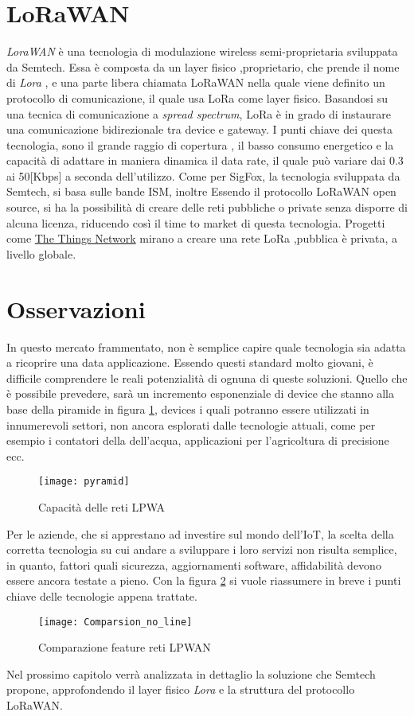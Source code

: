 \section{LoRaWAN}
\emph{LoraWAN} è una tecnologia di modulazione wireless semi-proprietaria 
sviluppata da Semtech. Essa è composta da un layer fisico ,proprietario, che
prende il nome di \emph{Lora}\cite{LoRaCss101} , e una parte libera chiamata 
LoRaWAN\cite{LoRaWAN101} nella quale viene definito un protocollo di comunicazione, 
il quale usa LoRa come layer fisico. 
Basandosi su una tecnica di comunicazione a \emph{spread spectrum}, LoRa è in
grado di instaurare una comunicazione bidirezionale tra device e gateway.
I punti chiave dei questa tecnologia, sono il grande raggio di copertura , il 
basso consumo energetico e la capacità di adattare in maniera dinamica il
data rate, il quale può variare dai 0.3 ai 50[Kbps] a seconda dell'utilizzo. 
Come per SigFox, la tecnologia sviluppata da Semtech, si basa sulle bande ISM,
inoltre Essendo il protocollo LoRaWAN open source, si ha la possibilità di
creare delle reti pubbliche o private senza disporre di alcuna licenza, 
riducendo così il time to market di questa tecnologia.  
Progetti come \href{https://www.thethingsnetwork.org/}{The Things Network}
mirano a creare una rete LoRa ,pubblica è privata,  a livello globale.
\section{Osservazioni}
In questo mercato frammentato, non è semplice capire quale tecnologia sia adatta
a ricoprire una data applicazione. Essendo questi standard molto giovani, è
difficile comprendere le reali potenzialità di ognuna di queste soluzioni.
Quello che è possibile prevedere, sarà un incremento esponenziale di device che
stanno alla base della piramide in figura \ref{fig:pyramid}, devices i quali
potranno essere utilizzati in innumerevoli settori, non ancora esplorati dalle
tecnologie attuali, come per esempio i contatori della dell'acqua, applicazioni
per l'agricoltura di precisione ecc. 

\begin{figure}[h]
    \centering 
                \texttt{[image: pyramid]}
    \caption{Capacità delle reti LPWA}
    \label{fig:pyramid} 
\end{figure}

\pagebreak
Per le aziende, che si apprestano ad investire sul mondo dell'IoT, la scelta
della corretta tecnologia su cui andare a sviluppare i loro servizi non risulta
semplice, in quanto, fattori quali sicurezza, aggiornamenti software,
affidabilità devono essere ancora testate a pieno. Con la figura
\ref{fig:feature_comp} si vuole riassumere in breve i punti chiave delle
tecnologie appena trattate.

\begin{figure}[h]
    \centering 
                \texttt{[image: Comparsion\_no\_line]}
    \caption{Comparazione feature reti LPWAN}
    \label{fig:feature_comp} 
\end{figure}

Nel prossimo capitolo verrà analizzata in dettaglio la soluzione che Semtech
propone, approfondendo il layer fisico \emph{Lora} e la struttura del protocollo
LoRaWAN.
